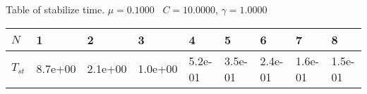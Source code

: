 \begin{center}
Table of stabilize time. $\mu = 0.1000$ \, $C = 10.0000$, $\gamma = 1.0000$
  
\begin{tabular}{|p{0.6in}|p{0.6in}|p{0.6in}|p{0.6in}|p{0.6in}|p{0.6in}|p{0.6in}|p{0.6in}|p{0.6in}|} \hline
$N$ &1 &2 &3 &4 &5 &6 &7 &8 \\ \hline 
$T_{st}$ &8.7e+00 &2.1e+00 &1.0e+00 &5.2e-01 &3.5e-01 &2.4e-01 &1.6e-01 &1.5e-01 \\ \hline 

\end{tabular}\\[20pt]
\end{center}
